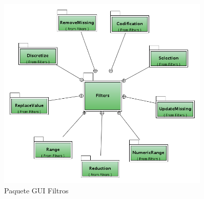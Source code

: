 \begin{figure}
\centering
\includegraphics[angle=90, width=0.9\textwidth]{imgsPaquetes/filters.png}
\caption{Paquete GUI Filtros}
\end{figure}
\newpage
